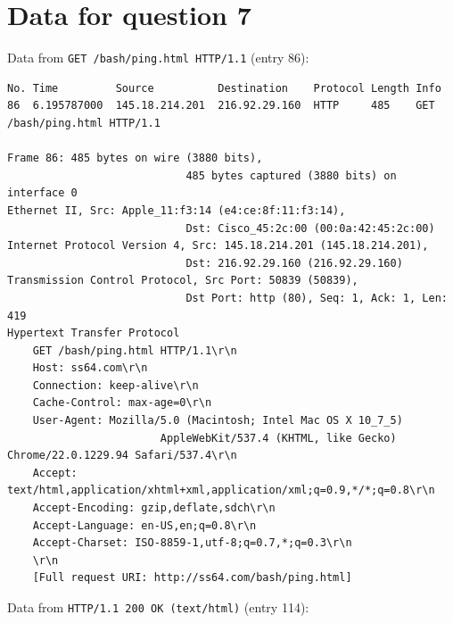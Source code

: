 \documentclass[12pt]{article} %
\begin{document}
 \section{Data for question 7}
 \label{app}
  Data from \texttt{GET
        /bash/ping.html HTTP/1.1} (entry 86):\\
        \begin{verbatim}
No. Time         Source          Destination    Protocol Length Info
86  6.195787000  145.18.214.201  216.92.29.160  HTTP     485    GET /bash/ping.html HTTP/1.1 

Frame 86: 485 bytes on wire (3880 bits), 
                            485 bytes captured (3880 bits) on interface 0
Ethernet II, Src: Apple_11:f3:14 (e4:ce:8f:11:f3:14), 
                            Dst: Cisco_45:2c:00 (00:0a:42:45:2c:00)
Internet Protocol Version 4, Src: 145.18.214.201 (145.18.214.201), 
                            Dst: 216.92.29.160 (216.92.29.160)
Transmission Control Protocol, Src Port: 50839 (50839), 
                            Dst Port: http (80), Seq: 1, Ack: 1, Len: 419
Hypertext Transfer Protocol
    GET /bash/ping.html HTTP/1.1\r\n
    Host: ss64.com\r\n
    Connection: keep-alive\r\n
    Cache-Control: max-age=0\r\n
    User-Agent: Mozilla/5.0 (Macintosh; Intel Mac OS X 10_7_5) 
                        AppleWebKit/537.4 (KHTML, like Gecko) Chrome/22.0.1229.94 Safari/537.4\r\n
    Accept: text/html,application/xhtml+xml,application/xml;q=0.9,*/*;q=0.8\r\n
    Accept-Encoding: gzip,deflate,sdch\r\n
    Accept-Language: en-US,en;q=0.8\r\n
    Accept-Charset: ISO-8859-1,utf-8;q=0.7,*;q=0.3\r\n
    \r\n
    [Full request URI: http://ss64.com/bash/ping.html]
    \end{verbatim}
    Data from  \texttt{HTTP/1.1 200 OK
    (text/html)} (entry 114):\\
\end{document}
